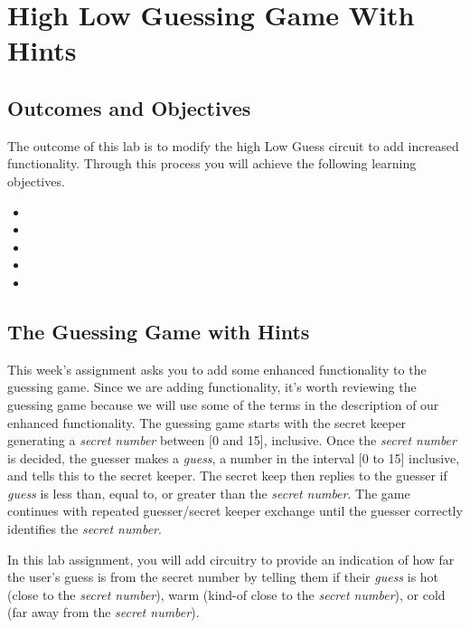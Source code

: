 \chapter{High Low Guessing Game With Hints}
\label{chapter:hlggwh}
\graphicspath{ {./Lab05HighLowWithHints/Fig} }

\section{Outcomes and Objectives}

The outcome of this lab is to modify the high Low Guess
circuit to add increased functionality.
Through this process you will achieve the following
learning objectives.
\begin{itemize}
    \item {}
    \item {}
    \item {}
    \item {}
    \item{}
\end{itemize}

\section{The Guessing Game with Hints}

This week's assignment asks you to add some enhanced functionality to
the guessing game. Since we are adding functionality, it's worth reviewing the
guessing game because we will use some of
the terms in the description of our enhanced functionality. The guessing game
starts with the secret keeper generating a \emph{secret number} between
{[}0 and 15{]}, inclusive. Once the \emph{secret number} is decided, the
guesser makes a \emph{guess}, a number in the interval {[}0 to 15{]}
inclusive, and tells this to the secret keeper. The secret keep then
replies to the guesser if \emph{guess} is less than, equal to, or
greater than the \emph{secret number}. The game continues with repeated
guesser/secret keeper exchange until the guesser correctly identifies
the \emph{secret number}.

In this lab assignment, you will add circuitry to provide an
indication of how far the user's guess is from the secret number by
telling them if their \emph{guess} is hot (close to the \emph{secret
number}), warm (kind-of close to the \emph{secret number}), or cold (far
away from the \emph{secret number}).

